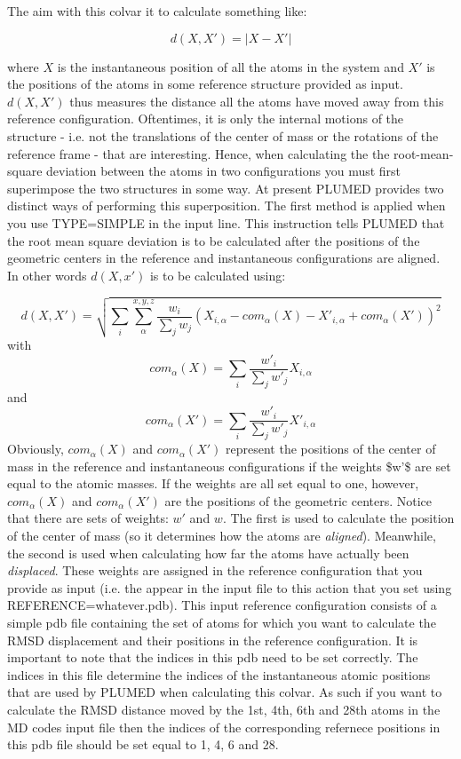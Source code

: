 The aim with this colvar it to calculate something like\+:

\[ d(X,X') = \vert X-X' \vert \]

where $ X $ is the instantaneous position of all the atoms in the system and $ X' $ is the positions of the atoms in some reference structure provided as input. $ d(X,X') $ thus measures the distance all the atoms have moved away from this reference configuration. Oftentimes, it is only the internal motions of the structure -\/ i.\+e. not the translations of the center of mass or the rotations of the reference frame -\/ that are interesting. Hence, when calculating the the root-\/mean-\/square deviation between the atoms in two configurations you must first superimpose the two structures in some way. At present P\+L\+U\+M\+E\+D provides two distinct ways of performing this superposition. The first method is applied when you use T\+Y\+P\+E=S\+I\+M\+P\+L\+E in the input line. This instruction tells P\+L\+U\+M\+E\+D that the root mean square deviation is to be calculated after the positions of the geometric centers in the reference and instantaneous configurations are aligned. In other words $d(X,x')$ is to be calculated using\+:

\[ d(X,X') = \sqrt{ \sum_i \sum_\alpha^{x,y,z} \frac{w_i}{\sum_j w_j}( X_{i,\alpha}-com_\alpha(X)-{X'}_{i,\alpha}+com_\alpha(X') )^2 } \] with \[ com_\alpha(X)= \sum_i \frac{w'_{i}}{\sum_j w'_j}X_{i,\alpha} \] and \[ com_\alpha(X')= \sum_i \frac{w'_{i}}{\sum_j w'_j}X'_{i,\alpha} \] Obviously, $ com_\alpha(X) $ and $ com_\alpha(X') $ represent the positions of the center of mass in the reference and instantaneous configurations if the weights \$w'\$ are set equal to the atomic masses. If the weights are all set equal to one, however, $com_\alpha(X) $ and $ com_\alpha(X') $ are the positions of the geometric centers. Notice that there are sets of weights\+: $ w' $ and $ w $. The first is used to calculate the position of the center of mass (so it determines how the atoms are {\itshape aligned}). Meanwhile, the second is used when calculating how far the atoms have actually been {\itshape displaced}. These weights are assigned in the reference configuration that you provide as input (i.\+e. the appear in the input file to this action that you set using R\+E\+F\+E\+R\+E\+N\+C\+E=whatever.\+pdb). This input reference configuration consists of a simple pdb file containing the set of atoms for which you want to calculate the R\+M\+S\+D displacement and their positions in the reference configuration. It is important to note that the indices in this pdb need to be set correctly. The indices in this file determine the indices of the instantaneous atomic positions that are used by P\+L\+U\+M\+E\+D when calculating this colvar. As such if you want to calculate the R\+M\+S\+D distance moved by the 1st, 4th, 6th and 28th atoms in the M\+D codes input file then the indices of the corresponding refernece positions in this pdb file should be set equal to 1, 4, 6 and 28.

